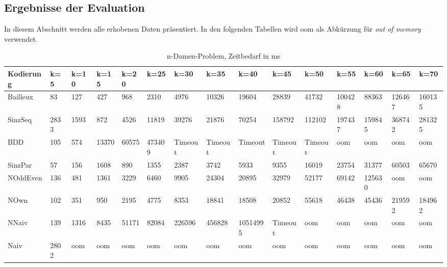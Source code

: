\documentclass[a4,abstract=on]{scrartcl}
\newcommand*\stdsection{}
\let\stdsection\section
\renewcommand*\section{%
    \clearpage\ifodd\value{page}\else\mbox{}\clearpage\fi
    \stdsection}
\begin{document}
\begin{landscape}
	\section{Ergebnisse der Evaluation}\label{anhang}
 In diesem Abschnitt werden alle erhobenen Daten präsentiert. In den folgenden Tabellen wird oom als Abkürzung für \textit{out of memory} verwendet.


	 \begin{table}[h!]
    \small
    \setlength{\tabcolsep}{0.11cm}
     \centering
     \begin{tabular}[width=\textwidth]{|l||l|l|l|l|l|l|l|l|l|l|l|l|l|l|}
	\hline
       \textbf{Kodierung}  & \textbf{k=5} & \textbf{k=10} & \textbf{k=15} &\textbf{k=20} &\textbf{k=25} &\textbf{k=30} &\textbf{k=35} &\textbf{k=40} &\textbf{k=45} &\textbf{k=50} &\textbf{k=55} &\textbf{k=60} &\textbf{k=65} &\textbf{k=70}\\
	\hline
	\hline
	Bailleux & 83 & 127 & 427 & 968 & 2310 & 4976 & 10326 & 19604 & 28839 & 41732 & 100428 & 88363 & 126467 & 160135\\
\hline
	SinzSeq & 2833 & 1593 & 872 & 4526 & 11819 & 39276 & 21876 & 70254 & 158792 & 112102 & 197437 & 159845 & 368742 & 281325 \\
\hline
	BDD & 105 & 574 & 13370 & 60575 & 473409 & Timeout & Timeout &Timeout &Timeout &Timeout & oom & oom & oom & oom\\
\hline
	SinzPar & 57 & 156 & 1608 & 890 & 1355 & 2387 & 3742 & 5933 & 9355 & 16019 & 23754 & 31377 & 60503 & 65670 \\
\hline
	NOddEven & 136 & 481 & 1361 & 3229 & 6460 & 9905 & 24304 & 20895 & 32979 & 52177& 69142 & 125630 & oom & oom\\
\hline
	NOwn & 102 & 351 & 950 & 2195 & 4775 & 8353& 18841 & 18508 & 20852 & 55618 & 46438 & 45436 & 219592 & 184962\\
 \hline
	NNaiv & 139 & 1316 & 8435 & 51171 & 82084 & 226596 & 456828 & 10514995 & Timeout & oom & oom & oom & oom & oom\\
\hline
	Naiv & 2802 & oom &  oom &  oom &  oom &  oom &  oom &  oom &  oom &  oom &  oom &  oom &  oom &  oom\\
\hline
       
     \end{tabular}

     \caption{n-Damen-Problem, Zeitbedarf in ms}
     \label{tbl:beispieltabelle}


\end{table}
\end{landscape}
\end{document}
